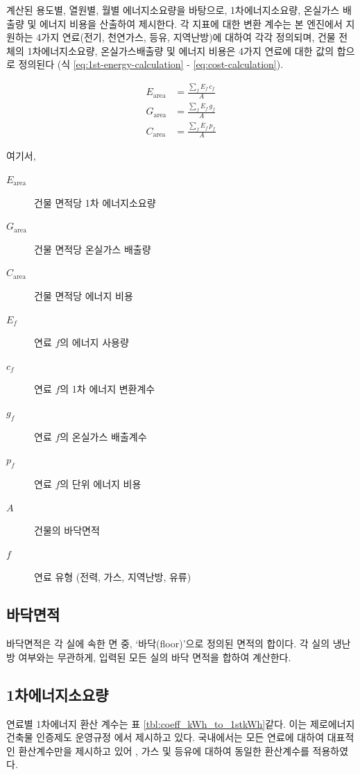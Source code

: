 \simulator\은 계산된 용도별, 열원별, 월별 에너지소요량을 바탕으로, 1차에너지소요량, 온실가스 배출량 및 에너지 비용을 산출하여 제시한다. 각 지표에 대한 변환 계수는 본 엔진에서 지원하는 4가지 연료(전기, 천연가스, 등유, 지역난방)에 대하여 각각 정의되며, 건물 전체의 1차에너지소요량, 온실가스배출량 및 에너지 비용은 4가지 연료에 대한 값의 합으로 정의된다 (식 \ref{eq:1st-energy-calculation} - \ref{eq:cost-calculation}).

\begin{align}
E_{\mathrm{area}} &= \frac{\sum_{f} E_f \, c_f}{A} \label{eq:1st-energy-calculation} \\
G_{\mathrm{area}} &= \frac{\sum_{f} E_f \, g_f}{A} \label{eq:ghg-calculation} \\
C_{\mathrm{area}} &= \frac{\sum_{f} E_f \, p_f}{A} \label{eq:cost-calculation}
\end{align}

여기서,

\begin{description}
\item[$E_{\mathrm{area}}$] 건물 면적당 1차 에너지소요량
\item[$G_{\mathrm{area}}$] 건물 면적당 온실가스 배출량
\item[$C_{\mathrm{area}}$] 건물 면적당 에너지 비용
\item[$E_f$] 연료 $f$의 에너지 사용량
\item[$c_f$] 연료 $f$의 1차 에너지 변환계수
\item[$g_f$] 연료 $f$의 온실가스 배출계수
\item[$p_f$] 연료 $f$의 단위 에너지 비용
\item[$A$] 건물의 바닥면적
\item[$f$] 연료 유형 (전력, 가스, 지역난방, 유류)
\end{description}

\subsection{바닥면적} \label{subsec:floorarea_definition_for_EUI}

바닥면적은 각 실에 속한 면 중, `바닥(floor)'으로 정의된 면적의 합이다. 각 실의 냉난방 여부와는 무관하게, 입력된 모든 실의 바닥 면적을 합하여 계산한다.

\subsection{1차에너지소요량}
연료별 1차에너지 환산 계수는 표 \ref{tbl:coeff_kWh_to_1stkWh}\와 같다. 이는 제로에너지건축물 인증제도 운영규정 \cite{law:energy_to_1stenergy} 에서 제시하고 있다. 국내에서는 모든 연료에 대하여 대표적인 환산계수만을 제시하고 있어 \cite{Jeong2021energydeungkeup}, 가스 및 등유에 대하여 동일한 환산계수를 적용하였다.


